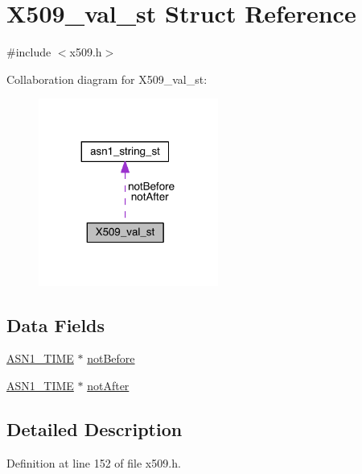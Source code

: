 \hypertarget{struct_x509__val__st}{}\section{X509\+\_\+val\+\_\+st Struct Reference}
\label{struct_x509__val__st}


{\ttfamily \#include $<$x509.\+h$>$}



Collaboration diagram for X509\+\_\+val\+\_\+st\+:\nopagebreak
\begin{figure}[H]
\begin{center}
\leavevmode
\includegraphics[width=167pt]{struct_x509__val__st__coll__graph}
\end{center}
\end{figure}
\subsection*{Data Fields}
\begin{DoxyCompactItemize}
\item 
\hyperlink{crypto_2ossl__typ_8h_ad8d7393bc444b691d2b2c20d247b4e27}{A\+S\+N1\+\_\+\+T\+I\+ME} $\ast$ \hyperlink{struct_x509__val__st_abdd751f34fa092666b6132ec25a8ed08}{not\+Before}
\item 
\hyperlink{crypto_2ossl__typ_8h_ad8d7393bc444b691d2b2c20d247b4e27}{A\+S\+N1\+\_\+\+T\+I\+ME} $\ast$ \hyperlink{struct_x509__val__st_a93918a5f18098406d632d394043eefc3}{not\+After}
\end{DoxyCompactItemize}


\subsection{Detailed Description}


Definition at line 152 of file x509.\+h.



